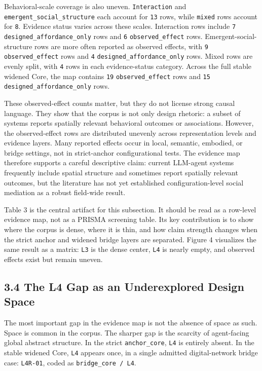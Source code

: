 \documentclass[
  twocolumn]{article}
\begin{document}
Behavioral-scale coverage is also uneven. \texttt{Interaction} and
\texttt{emergent\_social\_structure} each account for \texttt{13} rows,
while \texttt{mixed} rows account for \texttt{8}. Evidence status varies
across these scales. Interaction rows include \texttt{7}
\texttt{designed\_affordance\_only} rows and \texttt{6}
\texttt{observed\_effect} rows. Emergent-social-structure rows are more
often reported as observed effects, with \texttt{9}
\texttt{observed\_effect} rows and \texttt{4}
\texttt{designed\_affordance\_only} rows. Mixed rows are evenly split,
with \texttt{4} rows in each evidence-status category. Across the full
stable widened Core, the map contains \texttt{19}
\texttt{observed\_effect} rows and \texttt{15}
\texttt{designed\_affordance\_only} rows.

These observed-effect counts matter, but they do not license strong
causal language. They show that the corpus is not only design rhetoric:
a subset of systems reports spatially relevant behavioral outcomes or
associations. However, the observed-effect rows are distributed unevenly
across representation levels and evidence layers. Many reported effects
occur in local, semantic, embodied, or bridge settings, not in
strict-anchor configurational tests. The evidence map therefore supports
a careful descriptive claim: current LLM-agent systems frequently
include spatial structure and sometimes report spatially relevant
outcomes, but the literature has not yet established configuration-level
social mediation as a robust field-wide result.

Table 3 is the central artifact for this subsection. It should be read
as a row-level evidence map, not as a PRISMA screening table. Its key
contribution is to show where the corpus is dense, where it is thin, and
how claim strength changes when the strict anchor and widened bridge
layers are separated. Figure 4 visualizes the same result as a matrix:
\texttt{L3} is the dense center, \texttt{L4} is nearly empty, and
observed effects exist but remain uneven.

\subsection{3.4 The L4 Gap as an Underexplored Design
Space}\label{the-l4-gap-as-an-underexplored-design-space}

The most important gap in the evidence map is not the absence of space
as such. Space is common in the corpus. The sharper gap is the scarcity
of agent-facing global abstract structure. In the strict
\texttt{anchor\_core}, \texttt{L4} is entirely absent. In the stable
widened Core, \texttt{L4} appears once, in a single admitted
digital-network bridge case: \texttt{L4R-01}, coded as
\texttt{bridge\_core\ /\ L4}.
\end{document}
